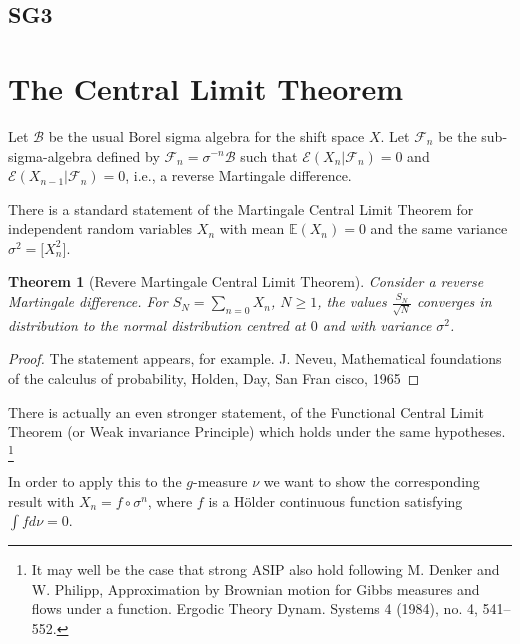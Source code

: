 \documentclass[11pt]{scrartcl}
\theoremstyle{plain} %
\newtheorem{thm}{Theorem}%
\theoremstyle{definition}
\begin{document}
\subsection{SG3}

\section{The Central Limit Theorem}



Let $\mathcal B$ be the usual Borel sigma algebra for the shift space $X$.
Let $\mathcal F_n$ be the sub-sigma-algebra defined by $\mathcal F_n = \sigma^{-n}\mathcal B$ such that  $\mathcal E(X_n | \mathcal F_{n})=0$
and  $\mathcal E(X_{n-1} | \mathcal F_{n})=0$, i.e., a reverse Martingale difference.  

There is a standard statement of the Martingale Central Limit Theorem for independent random variables $X_n$ with mean $\mathbb E(X_n)=0$ and the same variance $\sigma^2 = \mathbb [X_n^2]$.    

\begin{thm}[Revere Martingale Central Limit Theorem]
Consider a   reverse Martingale difference.
For  $S_N = \sum_{n=0} X_n$, $N \geq 1$, 
the values $\frac{S_N}{\sqrt{N}}$ converges in distribution to the normal distribution centred at $0$ and with variance $\sigma^2$.
\end{thm}

\begin{proof}
The statement appears, for example. J. Neveu, Mathematical foundations of the calculus of probability, Holden, Day, San Fran cisco, 1965
\end{proof}

There is actually an even stronger statement, of the Functional Central Limit Theorem
(or Weak invariance Principle) which holds under the same hypotheses.
\footnote{It may well be the case that strong ASIP also hold following
M.  Denker and W. Philipp, 
Approximation by Brownian motion for Gibbs measures and flows under a function.
Ergodic Theory Dynam. Systems 4 (1984), no. 4, 541--552.}


In order to apply this to the $g$-measure $\nu$ we want to show the corresponding result with $X_n = f \circ \sigma^n$, where $f$ is a H\"older continuous function satisfying $\int f d\nu =0$.    
\end{document}
